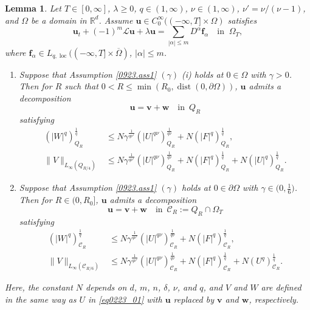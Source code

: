 \documentclass[reqno]{amsart}
\numberwithin{equation}{section}
\theoremstyle{plain}
\newtheorem{lemma}[theorem]{Lemma}
\theoremstyle{definition}
\theoremstyle{remark}
\begin{document}
\begin{lemma}		\label{0929-lem1}
Let $T\in [0,\infty]$,  $\lambda\ge 0$, $q\in (1,\infty)$, $\nu \in (1,\infty)$, $\nu' = \nu/(\nu-1)$, and $\Omega$ be a domain in ${\mathbb{R}}^d$.
Assume ${\boldsymbol{u}}\in C^\infty_0((-\infty,T]\times \Omega)$ satisfies
\begin{equation}		\label{1004.eq1}
{\boldsymbol{u}}_t+(-1)^m{\mathcal{L}}{\boldsymbol{u}}+\lambda {\boldsymbol{u}}=\sum_{|\alpha| \le m}D^\alpha {\boldsymbol{f}}_\alpha \quad \text{in }\ \Omega_T, 
\end{equation}
where ${\boldsymbol{f}}_\alpha\in L_{q,\operatorname{loc}}((-\infty,T] \times \overline{\Omega})$, $|\alpha| \le m$.
\begin{enumerate}[$(a)$]
\item
Suppose that Assumption \ref{0923.ass1} $(\gamma)$ {\rm (i)} holds at $0\in \Omega$ with $\gamma>0$. 
Then for $R$ such that $0 < R \le \min(R_0,\operatorname{dist} (0,\partial \Omega))$,  ${\boldsymbol{u}}$ admits a decomposition 
\[
{\boldsymbol{u}}={\boldsymbol{v}}+{\boldsymbol{w}} \quad \text{in }\, Q_R
\]
satisfying
\begin{align}
\label{0923.eq2}
(|W|^q)^{\frac{1}{q}}_{Q_R}&\le N\gamma^{\frac{1}{q\nu'}}(|U|^{q\nu} )^{\frac{1}{q\nu}}_{Q_R}+N(|F|^q)^{\frac{1}{q}}_{Q_R},\\
\label{0923.eq2a}
\|V\|_{L_\infty(Q_{R/4})}&\le N\gamma^{\frac{1}{q\nu'}}(|U|^{q\nu})^{\frac{1}{q\nu}}_{Q_R}+N(|F|^q)^{\frac{1}{q}}_{Q_R}+N(|U|^q)^{\frac{1}{q}}_{Q_R}.
\end{align}

\item
Suppose that Assumption \ref{0923.ass1} $(\gamma)$ holds at $0\in \partial \Omega$ with $\gamma\in \big(0,\frac{1}{6}\big)$.
Then for $R\in (0,R_0]$,  ${\boldsymbol{u}}$ admits a decomposition 
\[
{\boldsymbol{u}}={\boldsymbol{v}}+{\boldsymbol{w}} \quad \text{in }\, {\mathcal{C}}_R:=Q_R\cap \Omega_T
\]
satisfying
\begin{align}
\label{0923.eq2b}
(|W|^q)^{\frac{1}{q}}_{{\mathcal{C}}_R}&\le N\gamma^{\frac{1}{q\nu'}}(|U|^{q\nu} )^{\frac{1}{q\nu}}_{{\mathcal{C}}_R}+N(|F|^q)^{\frac{1}{q}}_{{\mathcal{C}}_R},\\
\label{0923.eq2c}
\|V\|_{L_\infty({\mathcal{C}}_{R/6})}&\le N\gamma^{\frac{1}{q\nu'}}(|U|^{q\nu})^{\frac{1}{q\nu}}_{{\mathcal{C}}_R}+N(|F|^q)^{\frac{1}{q}}_{{\mathcal{C}}_R}+N(U^q)^{\frac{1}{q}}_{{\mathcal{C}}_R}.
\end{align}
\end{enumerate}
Here, the constant $N$ depends on $d$, $m$, $n$, $\delta$, $\nu$, and $q$, and
$V$ and $W$ are defined in the same way as $U$ in \eqref{eq0223_01} with ${\boldsymbol{u}}$ replaced by ${\boldsymbol{v}}$ and ${\boldsymbol{w}}$, respectively.
\end{lemma}
\end{document}
